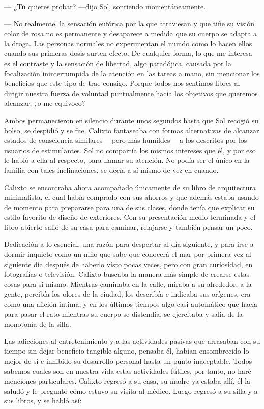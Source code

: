 \documentclass[12pt]{article}
\begin{document}
	--- ¿Tú quieres probar? ---dijo Sol, sonriendo momentáneamente.

	--- No realmente, la sensación eufórica por la que atraviesan y que
	tiñe su visión color de rosa no es permanente y desaparece a medida que
	su cuerpo se adapta a la droga. Las personas normales no experimentan el
	mundo como lo hacen ellos cuando sus primeras dosis surten efecto. De
	cualquier forma, lo que me interesa es el contraste y la sensación de
	libertad, algo paradójica, causada por la focalización ininterrumpida de
	la atención en las tareas a mano, sin mencionar los beneficios que este
	tipo de  trae consigo. Porque todos nos sentimos
	libres al dirigir nuestra fuerza de voluntad puntualmente hacia los
	objetivos que queremos alcanzar, ¿o me equivoco?

	Ambos permanecieron en silencio durante unos segundos hasta que Sol
	recogió su bolso, se despidió y se fue. Calixto fantaseaba con formas
	alternativas de alcanzar estados de consciencia similares ---pero más
	humildes--- a los descritos por los usuarios de estimulantes. Sol no
	compartía los mismos intereses que él, y por eso le habló a ella al
	respecto, para llamar su atención. No podía ser el único en la familia
	con tales inclinaciones, se decía a sí mismo de vez en cuando.

	Calixto se encontraba ahora acompañado únicamente de su libro de
	arquitectura minimalista, el cual había comprado con sus ahorros y que
	además estaba usando de momento para prepararse para una de sus
	clases, donde tenía que explicar su estilo favorito de diseño de
	exteriores. Con su presentación medio terminada y el libro abierto
	salió de su casa para caminar, relajarse y también pensar un poco.

	Dedicación a lo esencial, una razón para despertar al día siguiente, y
	para irse a dormir inquieto como un niño que sabe que conocerá el mar
	por primera vez al siguiente día después de haberlo visto pocas veces,
	pero con gran curiosidad, en fotografías o televisión. Calixto buscaba
	la manera más simple de crearse estas cosas para sí mismo. Mientras
	caminaba en la calle, miraba a su alrededor, a la gente, percibía los
	olores de la ciudad, los describía e indicaba sus orígenes, era como una
	afición intima, y en los últimos tiempos algo casi automático que hacía
	para pasar el rato mientras su cuerpo se distendía, se ejercitaba y
	salia de la monotonía de la silla.

	Las adicciones al entretenimiento
	y a las actividades pasivas que arrasaban con su tiempo sin dejar
	beneficio tangible alguno, pensaba él, habían ensombrecido lo mejor
	de sí e inhibido su desarrollo personal hasta un punto inaceptable.
	Todos sabemos cuales son en nuestra vida estas actividades fútiles,
	por tanto, no haré menciones particulares. Calixto regresó a su casa,
	su madre ya estaba allí, él la saludó y le preguntó cómo estuvo su
	visita al médico. Luego regresó a su silla y a sus libros, y se habló
	así:
\end{document}
